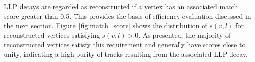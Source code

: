 \documentclass[PUB,UKenglish, texlive=2018]{\ATLASLATEXPATH atlasdoc}
\begin{document}
LLP decays are regarded as reconstructed if a vertex has an associated match score greater than 0.5. This provides the basis of efficiency evaluation discussed in the next section. 
Figure~\ref{fig:match_score} shows the distribution of $s(v,l)$ for reconstructed vertices satisfying $s(v,l)>0$. As presented, the majority of reconstructed vertices satisfy this requirement and generally have scores close to unity, indicating a high purity of tracks resulting from the associated LLP decay. %

\end{document}

